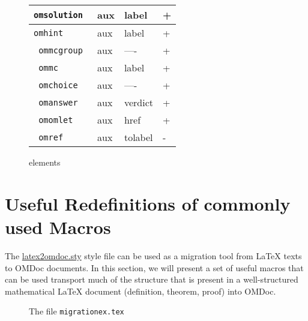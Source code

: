 \documentclass{article}
\def\omdocname{{\sc OMDoc}}
\begin{document}
\begin{figure}[htbp]
\begin{center}
\begin{tabular}{|>{\tt}l|l|l|l|}
 omsolution   & aux    & label               & + \\\hline
 omhint       & aux    & label               & + \\\hline
 ommcgroup    & aux    & ----                & + \\\hline
 ommc         & aux    & label               & + \\\hline
 omchoice     & aux    & ----                & + \\\hline
 omanswer     & aux    & verdict             & + \\\hline
 omomlet      & aux    & href                & + \\\hline
 omref        & aux    & tolabel             & - \\\hline
\end{tabular}
    \caption{\protect{\omdocname} elements}
    \label{fig:elements}
  \end{center}
\end{figure}

\section{Useful Redefinitions of commonly used Macros}\label{sec:useful-macs}

The {\url{latex2omdoc.sty}} style file can be used as a migration tool from
{\LaTeX} texts to {\omdocname} documents. In this section, we will present a set
of useful macros that can be used transport much of the structure that is present
in a well-structured mathematical {\LaTeX} document (definition, theorem, proof)
into {\omdocname}.
\begin{figure}[htbp]
  \begin{center}
    \fbox{\begin{minipage}{12cm}\scriptsize\end{minipage}}
    \caption{The file {\tt migrationex.tex}}
    \label{fig:migrationex.tex}
  \end{center}
\end{figure}
\end{document}
